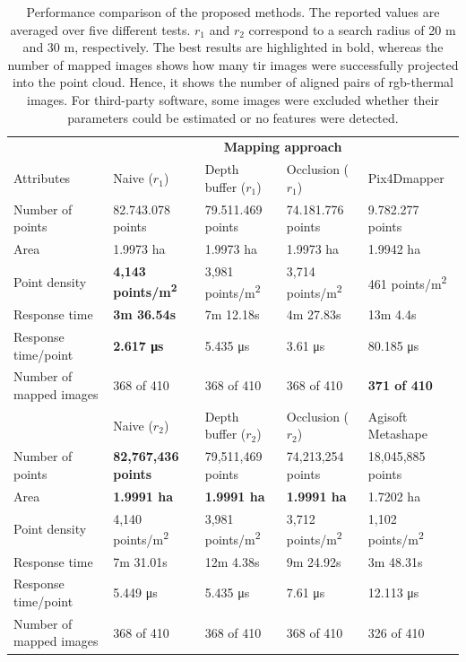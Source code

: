 \renewcommand{\arraystretch}{1.2}
    \begin{table}
    \sffamily
    \caption{Performance comparison of the proposed methods. The reported values are averaged over five different tests. $r_1$ and $r_2$ correspond to a search radius of 20 \si{\meter} and 30 \si{\meter}, respectively. The best results are highlighted in bold, whereas the number of mapped images shows how many \acrshort{tir} images were successfully projected into the point cloud. Hence, it shows the number of aligned pairs of \acrshort{rgb}-thermal images. For third-party software, some images were excluded whether their parameters could be estimated or no features were detected. }
    \label{table:thermal_point_cloud_approaches}
    \begin{tabular}{@{}lllll@{} }
    \toprule
    & \multicolumn{4}{c}{\textbf{Mapping approach}} \\
    \cmidrule{2-5}
    Attributes & Naive ($r_1$) & Depth buffer ($r_1$) & Occlusion ($r_1$) & Pix4Dmapper\\
    \midrule
    Number of points & 82.743.078 points & 79.511.469 points & 74.181.776 points & 9.782.277 points\\
    Area & 1.9973 ha & 1.9973 ha & 1.9973 ha & 1.9942 ha\\
    Point density & \textbf{4,143 points/\si{\metre\squared}} & 3,981 points/\si{\metre\squared} & 3,714 points/\si{\metre\squared} & 461 points/\si{\metre\squared}\\
    Response time & \textbf{3m 36.54s} & 7m 12.18s & 4m 27.83s & 13m 4.4s\\
    Response time/point & \textbf{2.617 \si{\micro\second}} & 5.435 \si{\micro\second} & 3.61 \si{\micro\second} & 80.185 \si{\micro\second}\\
    Number of mapped images & 368 of 410 & 368 of 410 & 368 of 410 & \textbf{371 of 410}\\[1mm]
    \cmidrule{2-5}
     & Naive ($r_2$) & Depth buffer ($r_2$) & Occlusion ($r_2$) & Agisoft Metashape\\
    \midrule
    Number of points & \textbf{82,767,436 points} & 79,511,469 points & 74,213,254 points & 18,045,885 points \\
    Area & \textbf{1.9991 ha} & \textbf{1.9991 ha} & \textbf{1.9991 ha} & 1.7202 ha \\
    Point density & 4,140 points/\si{\metre\squared} & 3,981 points/\si{\metre\squared} & 3,712 points/\si{\metre\squared} & 1,102 points/\si{\metre\squared} \\
    Response time & 7m 31.01s & 12m 4.38s & 9m 24.92s & 3m 48.31s \\
    Response time/point & 5.449 \si{\micro\second} & 5.435 \si{\micro\second} & 7.61 \si{\micro\second} & 12.113 \si{\micro\second} \\
    Number of mapped images & 368 of 410 & 368 of 410 & 368 of 410 & 326 of 410\\
    \bottomrule
    \end{tabular}
\end{table}
\renewcommand{\arraystretch}{1}

